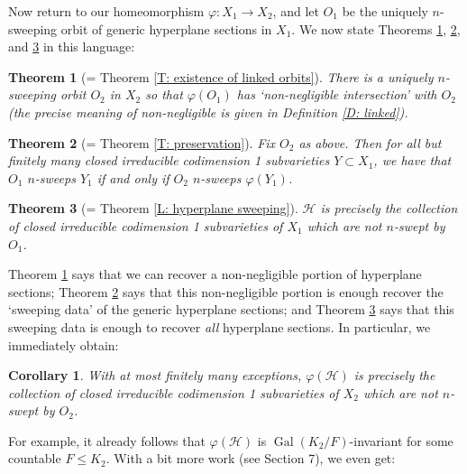 \documentclass{amsart}
\newtheorem{corollary}[theorem]{Corollary}
\newtheorem{alphthm}{Theorem}
\theoremstyle{definition}
\begin{document}
Now return to our homeomorphism $\varphi:X_1\rightarrow X_2$, and let $O_1$ be the uniquely $n$-sweeping orbit of generic hyperplane sections in $X_1$. We now state Theorems \ref{T: intro link existence}, \ref{T: intro link preservation}, and \ref{T: intro hyperplane sweeping} in this language: 

 \begin{alphthm}[= Theorem \ref{T: existence of linked orbits}]\label{T: intro link existence} There is a uniquely $n$-sweeping orbit $O_2$ in $X_2$ so that $\varphi(O_1)$ has `non-negligible intersection' with $O_2$ (the precise meaning of non-negligible is given in Definition \ref{D: linked}). 
 \end{alphthm}
 


\begin{alphthm}[= Theorem \ref{T: preservation}]\label{T: intro link preservation} Fix $O_2$ as above. Then for all but finitely many closed irreducible codimension 1 subvarieties $Y\subset X_1$, we have that $O_1$ $n$-sweeps $Y_1$ if and only if $O_2$ $n$-sweeps $\varphi(Y_1)$.
\end{alphthm}

   
\begin{alphthm}[= Theorem \ref{L: hyperplane sweeping}]\label{T: intro hyperplane sweeping} $\mathcal H$ is precisely the collection of closed irreducible codimension 1 subvarieties of $X_1$ which are not $n$-swept by $O_1$.
\end{alphthm}

Theorem \ref{T: intro link existence} says that we can recover a non-negligible portion of hyperplane sections; Theorem \ref{T: intro link preservation} says that this non-negligible portion is enough recover the `sweeping data' of the generic hyperplane sections; and Theorem \ref{T: intro hyperplane sweeping} says that this sweeping data is enough to recover \textit{all} hyperplane sections. In particular, we immediately obtain:


\begin{corollary}
    With at most finitely many exceptions, $\varphi(\mathcal H)$ is precisely the collection of closed irreducible codimension 1 subvarieties of $X_2$ which are not $n$-swept by $O_2$. 
\end{corollary}

For example, it already follows that $\varphi(\mathcal H)$ is $\operatorname{Gal}(K_2/F)$-invariant for some countable $F\leq K_2$. With a bit more work (see Section 7), we even get:
\end{document}
